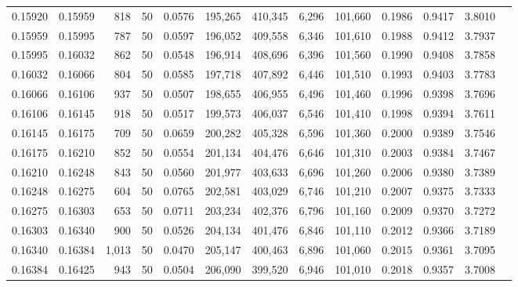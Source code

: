 \begin{tabular}{rrrrrrrrrrrrr}
0.15920 & 0.15959 &   818 &  50 &                                     0.0576 & 195,265 & 410,345 &   6,296 & 101,660 & 0.1986 & 0.9417 & 3.8010 \\
0.15959 & 0.15995 &   787 &  50 &                                     0.0597 & 196,052 & 409,558 &   6,346 & 101,610 & 0.1988 & 0.9412 & 3.7937 \\
0.15995 & 0.16032 &   862 &  50 &                                     0.0548 & 196,914 & 408,696 &   6,396 & 101,560 & 0.1990 & 0.9408 & 3.7858 \\
0.16032 & 0.16066 &   804 &  50 &                                     0.0585 & 197,718 & 407,892 &   6,446 & 101,510 & 0.1993 & 0.9403 & 3.7783 \\
0.16066 & 0.16106 &   937 &  50 &                                     0.0507 & 198,655 & 406,955 &   6,496 & 101,460 & 0.1996 & 0.9398 & 3.7696 \\
0.16106 & 0.16145 &   918 &  50 &                                     0.0517 & 199,573 & 406,037 &   6,546 & 101,410 & 0.1998 & 0.9394 & 3.7611 \\
0.16145 & 0.16175 &   709 &  50 &                                     0.0659 & 200,282 & 405,328 &   6,596 & 101,360 & 0.2000 & 0.9389 & 3.7546 \\
0.16175 & 0.16210 &   852 &  50 &                                     0.0554 & 201,134 & 404,476 &   6,646 & 101,310 & 0.2003 & 0.9384 & 3.7467 \\
0.16210 & 0.16248 &   843 &  50 &                                     0.0560 & 201,977 & 403,633 &   6,696 & 101,260 & 0.2006 & 0.9380 & 3.7389 \\
0.16248 & 0.16275 &   604 &  50 &                                     0.0765 & 202,581 & 403,029 &   6,746 & 101,210 & 0.2007 & 0.9375 & 3.7333 \\
0.16275 & 0.16303 &   653 &  50 &                                     0.0711 & 203,234 & 402,376 &   6,796 & 101,160 & 0.2009 & 0.9370 & 3.7272 \\
0.16303 & 0.16340 &   900 &  50 &                                     0.0526 & 204,134 & 401,476 &   6,846 & 101,110 & 0.2012 & 0.9366 & 3.7189 \\
0.16340 & 0.16384 & 1,013 &  50 &                                     0.0470 & 205,147 & 400,463 &   6,896 & 101,060 & 0.2015 & 0.9361 & 3.7095 \\
0.16384 & 0.16425 &   943 &  50 &                                     0.0504 & 206,090 & 399,520 &   6,946 & 101,010 & 0.2018 & 0.9357 & 3.7008 \\

\end{tabular}
